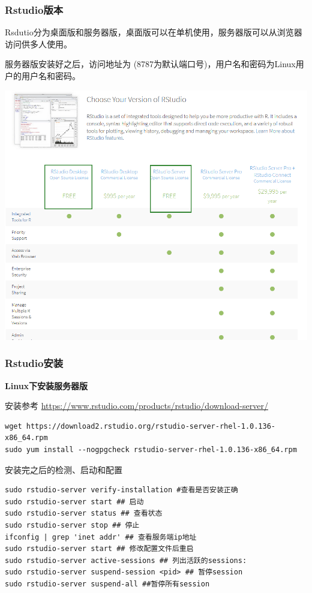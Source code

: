 \documentclass[]{article}
\numberwithin{figure}{section}
\numberwithin{table}{section}
\theoremstyle{definition}
\theoremstyle{definition}
\theoremstyle{definition}
\theoremstyle{remark}
\begin{document}
\subsubsection{Rstudio版本}\label{rstudio}

Rsdutio分为桌面版和服务器版，桌面版可以在单机使用，服务器版可以从浏览器访问供多人使用。

服务器版安装好之后，访问地址为
(8787为默认端口号)，用户名和密码为Linux用户的用户名和密码。

\begin{center}\includegraphics[width=0.95\linewidth,height=0.7\textheight,keepaspectratio]{images/Rstudio_version} \end{center}

\subsubsection{Rstudio安装}\label{rstudio}

\textbf{Linux下安装服务器版}

安装参考 \url{https://www.rstudio.com/products/rstudio/download-server/}

\begin{verbatim}
wget https://download2.rstudio.org/rstudio-server-rhel-1.0.136-x86_64.rpm
sudo yum install --nogpgcheck rstudio-server-rhel-1.0.136-x86_64.rpm
\end{verbatim}

安装完之后的检测、启动和配置

\begin{verbatim}
sudo rstudio-server verify-installation #查看是否安装正确
sudo rstudio-server start ## 启动
sudo rstudio-server status ## 查看状态
sudo rstudio-server stop ## 停止
ifconfig | grep 'inet addr' ## 查看服务端ip地址
sudo rstudio-server start ## 修改配置文件后重启
sudo rstudio-server active-sessions ## 列出活跃的sessions:
sudo rstudio-server suspend-session <pid> ## 暂停session
sudo rstudio-server suspend-all ##暂停所有session
\end{verbatim}
\end{document}
